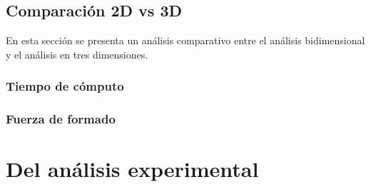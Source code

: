 \subsection{Comparación 2D vs 3D}

En esta sección se presenta un análisis comparativo entre el análisis bidimensional 
y el análisis en tres dimensiones.

\subsubsection{Tiempo de cómputo}

\subsubsection{Fuerza de formado}


\section{Del análisis experimental}


